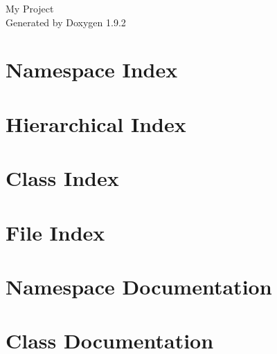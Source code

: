 \documentclass[twoside]{book}
\newcommand{\+}{\discretionary{\mbox{\scriptsize$\hookleftarrow$}}{}{}}
\newcommand{\clearemptydoublepage}{%
    \newpage{\pagestyle{empty}\cleardoublepage}%
  }
\begin{document}
  \raggedbottom
    \hypersetup{pageanchor=false,
                bookmarksnumbered=true,
                pdfencoding=unicode
               }
  \begin{titlepage}
  \vspace*{7cm}
  \begin{center}%
  {\Large My Project}\\
  \vspace*{1cm}
  {\large Generated by Doxygen 1.9.2}\\
  \end{center}
  \end{titlepage}
  \clearemptydoublepage
  \tableofcontents
  \clearemptydoublepage
  \hypersetup{pageanchor=true}
\chapter{Namespace Index}

\chapter{Hierarchical Index}

\chapter{Class Index}

\chapter{File Index}

\chapter{Namespace Documentation}



\chapter{Class Documentation}









\end{document}
